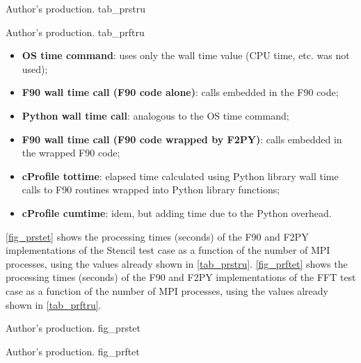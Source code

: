      {Author's production.} {tab_prstru}

     {Author's production.} {tab_prftru}

\begin{itemize}

\item \textbf{OS time command}: uses only the wall time value (CPU time, etc. was not used);  

\item \textbf{F90 wall time call (F90 code alone)}: calls embedded in the F90 code; 

\item \textbf{Python wall time call}: analogous to the OS time command; 

\item \textbf{F90 wall time call (F90 code wrapped by F2PY)}: calls embedded in the wrapped F90 code;

\item \textbf{cProfile tottime}: elapsed time calculated using Python library wall time calls to F90 routines wrapped into Python library functions;

\item \textbf{cProfile cumtime}: idem, but adding time due to the Python overhead.

\end{itemize}

\autoref {fig_prstet} shows the processing times (seconds) of the F90 and F2PY implementations of the Stencil test case as a function of the number of MPI processes, using the values already shown in \autoref {tab_prstru}. \autoref {fig_prftet} shows the processing times (seconds) of the F90 and F2PY implementations of the FFT test case as a function of the number of MPI processes, using the values already shown in \autoref {tab_prftru}.

     {Author's production.} {fig_prstet}

     {Author's production.} {fig_prftet}
